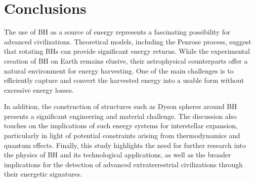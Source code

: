 \documentclass[fleqn,usenatbib]{mnras}
\begin{document}
\section{Conclusions}

The use of BH as a source of energy represents a fascinating possibility for advanced civilizations. Theoretical models, including the Penrose process, suggest that rotating BHs can provide significant energy returns. While the experimental creation of BH on Earth remains elusive, their astrophysical counterparts offer a natural environment for energy harvesting. One of the main challenges is to efficiently capture and convert the harvested energy into a usable form without excessive energy losses.

In addition, the construction of structures such as Dyson spheres around BH presents a significant engineering and material challenge. The discussion also touches on the implications of such energy systems for interstellar expansion, particularly in light of potential constraints arising from thermodynamics and quantum effects. Finally, this study highlights the need for further research into the physics of BH and its technological applications, as well as the broader implications for the detection of advanced extraterrestrial civilizations through their energetic signatures.











\bsp	%
\label{lastpage}
\end{document}
